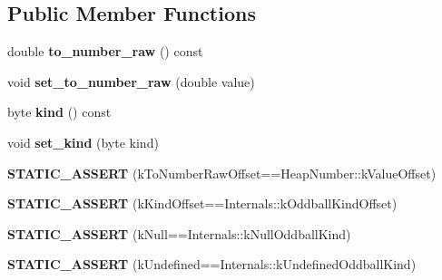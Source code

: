 \subsection*{Public Member Functions}
\begin{DoxyCompactItemize}
\item 
double {\bfseries to\+\_\+number\+\_\+raw} () const \hypertarget{classv8_1_1internal_1_1_oddball_a3ba4cdb414fb33b993b24bf90424348e}{}\label{classv8_1_1internal_1_1_oddball_a3ba4cdb414fb33b993b24bf90424348e}

\item 
void {\bfseries set\+\_\+to\+\_\+number\+\_\+raw} (double value)\hypertarget{classv8_1_1internal_1_1_oddball_ac159738887b097e944744bb5624dbe90}{}\label{classv8_1_1internal_1_1_oddball_ac159738887b097e944744bb5624dbe90}

\item 
byte {\bfseries kind} () const \hypertarget{classv8_1_1internal_1_1_oddball_a4e4dcda0283ac0d7c5075ac66a450c13}{}\label{classv8_1_1internal_1_1_oddball_a4e4dcda0283ac0d7c5075ac66a450c13}

\item 
void {\bfseries set\+\_\+kind} (byte kind)\hypertarget{classv8_1_1internal_1_1_oddball_a23ac73dee2b9eccc79fad51864a92061}{}\label{classv8_1_1internal_1_1_oddball_a23ac73dee2b9eccc79fad51864a92061}

\item 
{\bfseries S\+T\+A\+T\+I\+C\+\_\+\+A\+S\+S\+E\+RT} (k\+To\+Number\+Raw\+Offset==Heap\+Number\+::k\+Value\+Offset)\hypertarget{classv8_1_1internal_1_1_oddball_a006489f581dec0fe6d2bc2c467fa2817}{}\label{classv8_1_1internal_1_1_oddball_a006489f581dec0fe6d2bc2c467fa2817}

\item 
{\bfseries S\+T\+A\+T\+I\+C\+\_\+\+A\+S\+S\+E\+RT} (k\+Kind\+Offset==Internals\+::k\+Oddball\+Kind\+Offset)\hypertarget{classv8_1_1internal_1_1_oddball_adaa90c45078014efb0017364c9fc7505}{}\label{classv8_1_1internal_1_1_oddball_adaa90c45078014efb0017364c9fc7505}

\item 
{\bfseries S\+T\+A\+T\+I\+C\+\_\+\+A\+S\+S\+E\+RT} (k\+Null==Internals\+::k\+Null\+Oddball\+Kind)\hypertarget{classv8_1_1internal_1_1_oddball_a8b098918d70d60336f7cb6686df4cee3}{}\label{classv8_1_1internal_1_1_oddball_a8b098918d70d60336f7cb6686df4cee3}

\item 
{\bfseries S\+T\+A\+T\+I\+C\+\_\+\+A\+S\+S\+E\+RT} (k\+Undefined==Internals\+::k\+Undefined\+Oddball\+Kind)\hypertarget{classv8_1_1internal_1_1_oddball_ac59ae66d1803a5c087b45515d9358891}{}\label{classv8_1_1internal_1_1_oddball_ac59ae66d1803a5c087b45515d9358891}

\end{DoxyCompactItemize}
